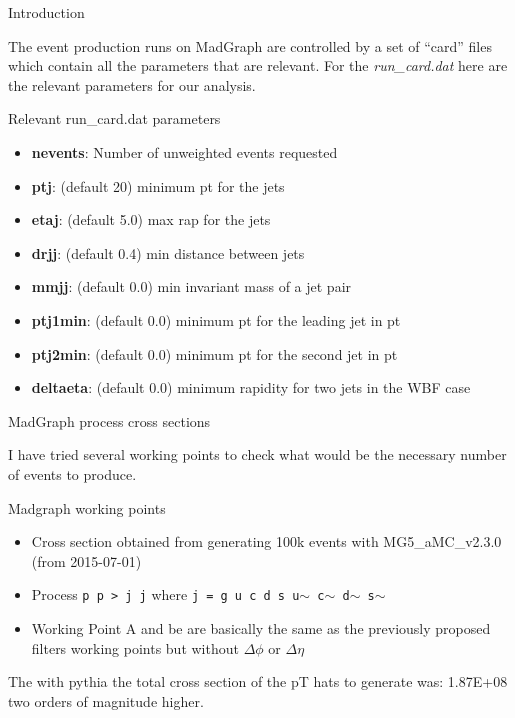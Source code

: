 \documentclass[8pt]{beamer}
\begin{document}
\begin{frame}{Introduction}

The event production runs on MadGraph are controlled by a set of ``card'' files which contain all the parameters that are relevant. For the \textit{run\_card.dat} here are the relevant parameters for our analysis.

\begin{block}{Relevant run\_card.dat parameters}

\begin{itemize}
  \item \textbf{nevents}: Number of unweighted events requested 
  \item \textbf{ptj}: (default 20) minimum pt for the jets 
  \item \textbf{etaj}: (default 5.0) max rap for the jets 
  \item \textbf{drjj}: (default 0.4) min distance between jets
  \item \textbf{mmjj}: (default 0.0) min invariant mass of a jet pair 
  \item \textbf{ptj1min}: (default 0.0) minimum pt for the leading jet in pt
  \item \textbf{ptj2min}: (default 0.0) minimum pt for the second jet in pt
  \item \textbf{deltaeta}: (default 0.0) minimum rapidity for two jets in the WBF case 
\end{itemize}

\end{block}

\end{frame}

\begin{frame}{MadGraph process cross sections}

I have tried several working points to check what would be the necessary number of events to produce.

\begin{block}{Madgraph working points}



\end{block}

\tiny
\begin{itemize}
  \item Cross section obtained from generating 100k events with MG5\_aMC\_v2.3.0 (from 2015-07-01)
  \item Process \texttt{p p > j j} where \texttt{j = g u c d s u$\sim$ c$\sim$ d$\sim$ s$\sim$}
  \item Working Point A and be are basically the same as the previously proposed filters working points but without $\Delta\phi$ or $\Delta\eta$ 
\end{itemize}

The with pythia the total cross section of the pT hats to generate was: \num{1.87E+08} two orders of magnitude higher.

\end{frame}
\end{document}
